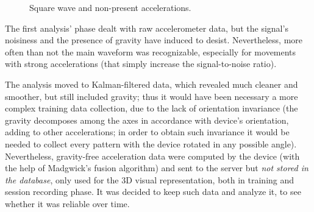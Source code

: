 \begin{center}
	\begin{figure}[ht!]
		\caption{Square wave and non-present accelerations.}
	\end{figure}
\end{center}

The first analysis' phase dealt with raw accelerometer data, but the signal's noisiness and the presence of gravity have induced to desist. Nevertheless, more often than not the main waveform was recognizable, especially for movements with strong accelerations (that simply increase the signal-to-noise ratio).
\bigbreak

The analysis moved to Kalman-filtered data, which revealed much cleaner and smoother, but still included gravity; thus it would have been necessary a more complex training data collection, due to the lack of orientation invariance (the gravity decomposes among the axes in accordance with device's orientation, adding to other accelerations; in order to obtain such invariance it would be needed to collect every pattern with the device rotated in any possible angle).\\
Nevertheless, gravity-free acceleration data were computed by the device (with the help of Madgwick's fusion algorithm) and sent to the server but \textit{not stored in the database}, only used for the 3D visual representation, both in training and session recording phase. It was decided to keep such data and analyze it, to see whether it was reliable over time.
\bigbreak


